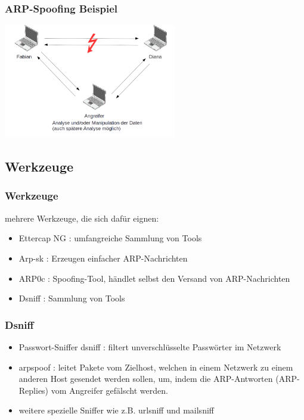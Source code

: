 \documentclass{beamer}
\begin{document}
	   	\begin{frame}
	   		\frametitle{ARP-Spoofing Beispiel}
	   		\includegraphics[height=5.0cm]{ARP-Tabelle-manipuliert_1.png}
	   	\end{frame}
    	
    	\subsection*{Werkzeuge}
		\begin{frame}
        	\frametitle{Werkzeuge}
        	mehrere Werkzeuge, die sich dafür eignen:
        	\begin{itemize}
        	\item Ettercap NG : umfangreiche Sammlung von Tools
        	\item Arp-sk : Erzeugen einfacher ARP-Nachrichten
        	\item ARP0c : Spoofing-Tool, händlet selbst den Versand von ARP-Nachrichten
        	\item Dsniff : Sammlung von Tools
        	\end{itemize}    	
    	\end{frame}
    	
    	\begin{frame}
	    	\frametitle{Dsniff}
	    	\begin{itemize}
        	\item Passwort-Sniffer dsniff : filtert unverschlüsselte Passwörter im Netzwerk
        	\item arpspoof : leitet Pakete vom Zielhost, welchen in einem Netzwerk zu einem anderen Host gesendet werden sollen, um, indem die ARP-Antworten (ARP-Replies) vom Angreifer gefälscht werden.
        	\item weitere spezielle Sniffer wie z.B. urlsniff und mailsniff
        	\end{itemize}
    	\end{frame}
\end{document}
